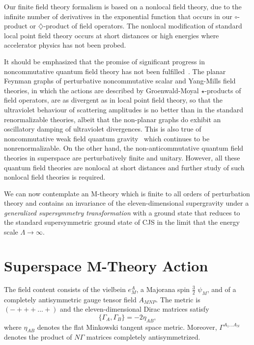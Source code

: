 \documentclass[a4paper,12pt]{article}
\begin{document}
Our finite field theory formalism is based on a nonlocal field theory, due to the
infinite number of derivatives in the exponential function that occurs in our
$\circ$-product or $\diamondsuit$-product of field operators. The nonlocal
modification of standard local point field theory occurs at short distances or high
energies where accelerator physics has not been probed.

It should be emphasized that the promise of significant progress in
noncommutative quantum field theory has not been
fulfilled~\cite{Szabo,Moffat6,Moffat7}. The planar Feynman graphs of perturbative
noncommutative scalar and Yang-Mills field theories, in which the actions are
described by Groenwald-Moyal $\star$-products of field operators, are as divergent
as in local point field theory, so that the ultraviolet behaviour of scattering
amplitudes is no better than in the standard renormalizable theories, albeit that
the non-planar graphs do exhibit an oscillatory damping of ultraviolet
divergences. This is also true of noncommutative weak field quantum
gravity~\cite{Moffat6,Moffat7} which continues to be nonrenormalizable. On the other
hand, the non-anticommutative quantum field theories in superspace are perturbatively
finite and unitary. However, all these quantum field theories are nonlocal at short
distances and further study of such nonlocal field theories is required.

We can now contemplate an M-theory which is finite to all orders of
perturbation theory and contains an invariance of the eleven-dimensional
supergravity under a {\it generalized supersymmetry transformation} with a
ground state that reduces to the standard supersymmetric ground state of
CJS in the limit that the energy scale $\Lambda\rightarrow\infty$.

\section{\bf Superspace M-Theory Action}

The field content consists of the vielbein $e^A_M$, a
Majorana spin $\frac{3}{2}$ $\psi_M$, and of a completely antisymmetric
gauge tensor field $A_{MNP}$. The metric is $(-+++...+)$ and the
eleven-dimensional Dirac matrices satisfy
\begin{equation}
\{\Gamma_A,\Gamma_B\}=-2\eta_{AB},
\end{equation}
where $\eta_{AB}$ denotes the flat Minkowski tangent space metric.
Moreover, $\Gamma^{A_1...A_N}$ denotes the product of $N\Gamma$ matrices
completely antisymmetrized.
\end{document}
